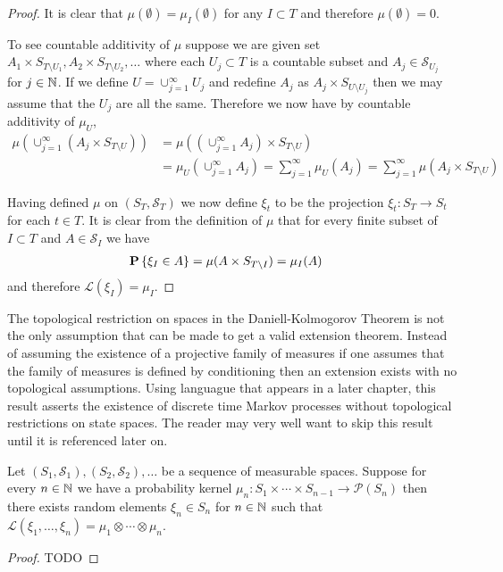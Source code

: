 \begin{proof}
It is clear that $\mu(\emptyset) = \mu_I(\emptyset)$ for any $I
\subset T$ and therefore $\mu(\emptyset) = 0$.  

To see countable additivity of $\mu$ suppose we are given set $A_1
\times S_{T \setminus U_1}, A_2 \times S_{T \setminus U_2}, \dotsc$
where each $U_j \subset T$ is a countable subset and $A_j \in
\mathcal{S}_{U_j}$ for $j \in \mathbb{N}$.  If we define $U =
\cup_{j=1}^\infty U_j$ and redefine $A_j$ as $A_j \times S_{U
  \setminus U_j}$ then we may assume that the $U_j$ are all the same.
  Therefore we now have by countable additivity of $\mu_U$,
\begin{align*}
\mu(\cup_{j=1}^\infty (A_j \times S_{T\setminus U})) &=
\mu((\cup_{j=1}^\infty A_j) \times S_{T\setminus U}) \\
&=\mu_U(\cup_{j=1}^\infty A_j) = \sum_{j=1}^\infty \mu_U(A_j) =
\sum_{j=1}^\infty \mu(A_j \times S_{T \setminus U}) 
\end{align*}

Having defined $\mu$ on $(S_T, \mathcal{S}_T)$ we now define $\xi_t$
to be the projection $\xi_t : S_T \to S_t$ for each $t \in T$.  It is
clear from the definition of $\mu$ that for every finite subset of $I
\subset T$ and $A \in \mathcal{S}_I$ we have
\begin{align*}
\textbf{P}\left \{ \xi_I \in A \right \} &= \mu(A \times S_{T \setminus I}) = \mu_I(A)
\end{align*}
and therefore $\mathcal{L}(\xi_I) = \mu_I$.
\end{proof}

The topological restriction on spaces in the Daniell-Kolmogorov Theorem is not
the only assumption that can be made to get a valid extension theorem.  Instead of assuming the existence of a projective
family of measures if one assumes that the family of measures is defined by conditioning then an extension exists with
no topological assumptions.  Using languague that appears in a later chapter, this result asserts the existence of discrete time
Markov processes without topological restrictions on state spaces.  The reader may very well want to skip this result until it is
referenced later on.

\begin{thm}\label{IonescuTulceaExtension}Let $(S_1, \mathcal{S}_1), (S_2, \mathcal{S}_2), \dotsc$ be a sequence of 
measurable spaces.  Suppose for every $n \in \mathbb{N}$ we have a probability kernel $\mu_n : S_1 \times \dotsb \times S_{n-1} \to \mathcal{P}(S_n)$ then 
there exists random elements $\xi_n \in S_n$ for $n \in \mathbb{N}$ such that $\mathcal{L}(\xi_1, \dotsc, \xi_n) = \mu_1 \otimes \dotsb \otimes \mu_n$.
\end{thm}
\begin{proof}
TODO
\end{proof}

